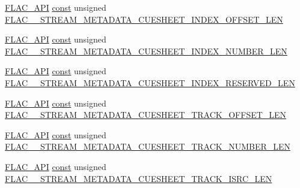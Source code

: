 \begin{DoxyCompactItemize}
\item 
\hyperlink{group__flac__export_ga56ca07df8a23310707732b1c0007d6f5}{F\+L\+A\+C\+\_\+\+A\+PI} \hyperlink{getopt1_8c_a2c212835823e3c54a8ab6d95c652660e}{const} unsigned \hyperlink{group__flac__format_ga6579eee01a62ce96e3e243e3bd1ec478}{F\+L\+A\+C\+\_\+\+\_\+\+S\+T\+R\+E\+A\+M\+\_\+\+M\+E\+T\+A\+D\+A\+T\+A\+\_\+\+C\+U\+E\+S\+H\+E\+E\+T\+\_\+\+I\+N\+D\+E\+X\+\_\+\+O\+F\+F\+S\+E\+T\+\_\+\+L\+EN}
\item 
\hyperlink{group__flac__export_ga56ca07df8a23310707732b1c0007d6f5}{F\+L\+A\+C\+\_\+\+A\+PI} \hyperlink{getopt1_8c_a2c212835823e3c54a8ab6d95c652660e}{const} unsigned \hyperlink{group__flac__format_ga1cbe4b28f16dd566feb74782f2728b0e}{F\+L\+A\+C\+\_\+\+\_\+\+S\+T\+R\+E\+A\+M\+\_\+\+M\+E\+T\+A\+D\+A\+T\+A\+\_\+\+C\+U\+E\+S\+H\+E\+E\+T\+\_\+\+I\+N\+D\+E\+X\+\_\+\+N\+U\+M\+B\+E\+R\+\_\+\+L\+EN}
\item 
\hyperlink{group__flac__export_ga56ca07df8a23310707732b1c0007d6f5}{F\+L\+A\+C\+\_\+\+A\+PI} \hyperlink{getopt1_8c_a2c212835823e3c54a8ab6d95c652660e}{const} unsigned \hyperlink{group__flac__format_gaa3266be1c92182925c0d02c660617feb}{F\+L\+A\+C\+\_\+\+\_\+\+S\+T\+R\+E\+A\+M\+\_\+\+M\+E\+T\+A\+D\+A\+T\+A\+\_\+\+C\+U\+E\+S\+H\+E\+E\+T\+\_\+\+I\+N\+D\+E\+X\+\_\+\+R\+E\+S\+E\+R\+V\+E\+D\+\_\+\+L\+EN}
\item 
\hyperlink{group__flac__export_ga56ca07df8a23310707732b1c0007d6f5}{F\+L\+A\+C\+\_\+\+A\+PI} \hyperlink{getopt1_8c_a2c212835823e3c54a8ab6d95c652660e}{const} unsigned \hyperlink{group__flac__format_ga2998481389f82ac8ec3c8aa1e405fb56}{F\+L\+A\+C\+\_\+\+\_\+\+S\+T\+R\+E\+A\+M\+\_\+\+M\+E\+T\+A\+D\+A\+T\+A\+\_\+\+C\+U\+E\+S\+H\+E\+E\+T\+\_\+\+T\+R\+A\+C\+K\+\_\+\+O\+F\+F\+S\+E\+T\+\_\+\+L\+EN}
\item 
\hyperlink{group__flac__export_ga56ca07df8a23310707732b1c0007d6f5}{F\+L\+A\+C\+\_\+\+A\+PI} \hyperlink{getopt1_8c_a2c212835823e3c54a8ab6d95c652660e}{const} unsigned \hyperlink{group__flac__format_ga29c8c5cd71c4cc66ba322e3cf60c78a7}{F\+L\+A\+C\+\_\+\+\_\+\+S\+T\+R\+E\+A\+M\+\_\+\+M\+E\+T\+A\+D\+A\+T\+A\+\_\+\+C\+U\+E\+S\+H\+E\+E\+T\+\_\+\+T\+R\+A\+C\+K\+\_\+\+N\+U\+M\+B\+E\+R\+\_\+\+L\+EN}
\item 
\hyperlink{group__flac__export_ga56ca07df8a23310707732b1c0007d6f5}{F\+L\+A\+C\+\_\+\+A\+PI} \hyperlink{getopt1_8c_a2c212835823e3c54a8ab6d95c652660e}{const} unsigned \hyperlink{group__flac__format_gac3f768f4fa5d8ea1d10a3884c29f4a35}{F\+L\+A\+C\+\_\+\+\_\+\+S\+T\+R\+E\+A\+M\+\_\+\+M\+E\+T\+A\+D\+A\+T\+A\+\_\+\+C\+U\+E\+S\+H\+E\+E\+T\+\_\+\+T\+R\+A\+C\+K\+\_\+\+I\+S\+R\+C\+\_\+\+L\+EN}

\end{DoxyCompactItemize}

